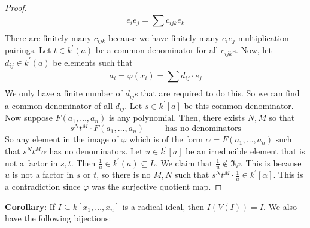 \documentclass{report}
\begin{document}
\begin{proof}
            \begin{equation*}
                e_{i}e_{j} = \sum_{}^{} c_{ijk}e_{k}
            \end{equation*}
        There are finitely many $c_{ijk}$ because we have finitely many $e_{i}e_{j}$ multiplication pairings. Let $t \in k^{\prime}(a)$ be a common denominator for all $c_{ijk}$s. Now, let $d_{ij} \in k^{\prime}(a)$ be elements such that 
            \begin{equation*}
                a_{i} = \varphi(x_{i}) = \sum_{}^{} d_{ij} \cdot e_{j} 
            \end{equation*}
        We only have a finite number of $d_{ij}$s that are required to do this. So we can find a common denominator of all $d_{ij}$. Let $s \in k^{\prime}[a]$ be this common denominator. Now suppose $F(a_{1}, \ldots , a_{n})$ is any polynomial. Then, there exists $N, M$ so that 
            \begin{equation*}
                s^{N}t^{M} \cdot F(a_{1}, \ldots , a_{n}) \hspace{30pt} \text{has no denominators}
            \end{equation*}
        So any element in the image of $\varphi$ which is of the form $\alpha = F(a_{1}, \ldots , a_{n})$ such that $s^{N}t^{M}\alpha$ has no denominators. Let $u \in k^{\prime}[a]$ be an irreducible element that is not a factor in $s, t$. Then $\frac{1}{u} \in k^{\prime}(a) \subseteq  L$. We claim that $\frac{1}{u} \notin \Im{\varphi}$. This is because $u$ is not a factor in $s$ or $t$, so there is no $M, N$ such that $s^{N}t^{M} \cdot \frac{1}{u} \in k^{\prime}[\alpha]$. This is a contradiction since $\varphi$ was the surjective quotient map.
    \end{proof}

\textbf{Corollary}: If $I \subseteq k[x_{1}, \ldots , x_{n}]$ is a radical ideal, then $I(V(I)) = I$. We also have the following bijections:
    \begin{center}
    \end{center} 
\end{document}
